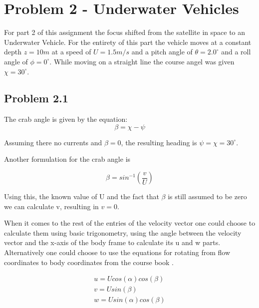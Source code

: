\section*{Problem 2 - Underwater Vehicles}
For part 2 of this assignment the focus shifted from the satellite in space to an Underwater Vehicle. For the entirety of this part the vehicle moves at a constant depth $z=10m$ at a speed of $U=1.5m/s$ and a pitch angle of $\theta = 2.0^\circ$ and a roll angle of $\phi = 0^\circ$. While moving on a straight line the course angel was given $\chi = 30^\circ$.
\subsection*{Problem 2.1}
The crab angle is given by the equation:
\begin{equation}
    \beta = \chi - \psi
\end{equation}

Assuming there no currents and $\beta = 0$, the resulting heading is $\psi = \chi = 30^\circ$.

Another formulation for the crab angle is

\begin{equation}
    \beta = sin^{-1}(\frac{v}{U})
    \label{eq:beta_2}
\end{equation}

Using this, the known value of U and the fact that $\beta$ is still assumed to be zero we can calculate v, resulting in $v=0$.

When it comes to the rest of the entries of the velocity vector one could choose to calculate them using basic trigonometry, using the angle between the velocity vector and the x-axis of the body frame to calculate its u and w parts. Alternatively one could choose to use the equations for rotating from flow coordinates to body coordinates from the course book \cite{Fossen2011}. 

\begin{subequations}
\label{eq:vel_vect_calc}
    \begin{align}
        u = U cos(\alpha)cos(\beta) \\
        v = U sin(\beta) \\
        w = U sin(\alpha)cos(\beta)
    \end{align}
\end{subequations}

